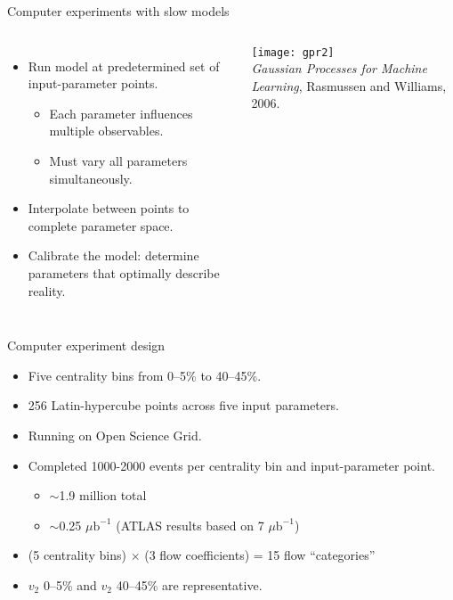 \documentclass{beamer}
\begin{document}
\begin{frame}{Computer experiments with slow models}
  \begin{columns}
    \begin{itemize}
      \item Run model at predetermined set of input-parameter points.
        \begin{itemize}
          \item Each parameter influences multiple observables.
          \item Must vary all parameters simultaneously.
        \end{itemize}
      \item Interpolate between points to complete parameter space.
      \item Calibrate the model:  determine parameters that optimally describe reality.
    \end{itemize}

    \centering
    \texttt{[image: gpr2]} \\
    \flushright\tiny \emph{Gaussian Processes for Machine Learning}, Rasmussen and Williams, 2006.
  \end{columns}
\end{frame}




\begin{frame}{Computer experiment design}
  \begin{itemize}
    \item Five centrality bins from 0--5\% to 40--45\%.
    \item 256 Latin-hypercube points across five input parameters.
    \item Running on Open Science Grid.
    \item Completed 1000-2000 events per centrality bin and input-parameter point.
      \begin{itemize}
        \item $\sim$1.9 million total
        \item $\sim$0.25 $\mu\text{b}^{-1}$  (ATLAS results based on 7 $\mu\text{b}^{-1}$)
      \end{itemize}
  \end{itemize}

  \bgs
  \begin{itemize}
    \item (5 centrality bins) $\times$ (3 flow coefficients) = 15 flow ``categories''
    \item $v_2$ 0--5\% and $v_2$ 40--45\% are representative.
  \end{itemize}
\end{frame}
\end{document}

